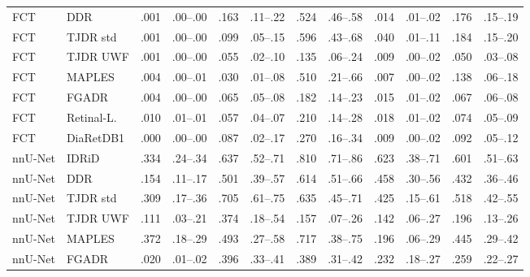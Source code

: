 \begin{landscape}
{\begin{longtable}{l l c c c c c c c c c c}
FCT & DDR & .001 & \scriptsize .00--.00 & .163 & \scriptsize .11--.22 & .524 & \scriptsize .46--.58 & .014 & \scriptsize .01--.02 & .176 & \scriptsize .15--.19 \\
FCT & TJDR std & .001 & \scriptsize .00--.00 & .099 & \scriptsize .05--.15 & .596 & \scriptsize .43--.68 & .040 & \scriptsize .01--.11 & .184 & \scriptsize .15--.20 \\
FCT & TJDR UWF & .001 & \scriptsize .00--.00 & .055 & \scriptsize .02--.10 & .135 & \scriptsize .06--.24 & .009 & \scriptsize .00--.02 & .050 & \scriptsize .03--.08 \\
FCT & MAPLES & .004 & \scriptsize .00--.01 & .030 & \scriptsize .01--.08 & .510 & \scriptsize .21--.66 & .007 & \scriptsize .00--.02 & .138 & \scriptsize .06--.18 \\
FCT & FGADR & .004 & \scriptsize .00--.00 & .065 & \scriptsize .05--.08 & .182 & \scriptsize .14--.23 & .015 & \scriptsize .01--.02 & .067 & \scriptsize .06--.08 \\
FCT & Retinal-L. & .010 & \scriptsize .01--.01 & .057 & \scriptsize .04--.07 & .210 & \scriptsize .14--.28 & .018 & \scriptsize .01--.02 & .074 & \scriptsize .05--.09 \\
FCT & DiaRetDB1 & .000 & \scriptsize .00--.00 & .087 & \scriptsize .02--.17 & .270 & \scriptsize .16--.34 & .009 & \scriptsize .00--.02 & .092 & \scriptsize .05--.12 \\
nnU-Net & IDRiD & .334 & \scriptsize .24--.34 & .637 & \scriptsize .52--.71 & .810 & \scriptsize .71--.86 & .623 & \scriptsize .38--.71 & .601 & \scriptsize .51--.63 \\
nnU-Net & DDR & .154 & \scriptsize .11--.17 & .501 & \scriptsize .39--.57 & .614 & \scriptsize .51--.66 & .458 & \scriptsize .30--.56 & .432 & \scriptsize .36--.46 \\
nnU-Net & TJDR std & .309 & \scriptsize .17--.36 & .705 & \scriptsize .61--.75 & .635 & \scriptsize .45--.71 & .425 & \scriptsize .15--.61 & .518 & \scriptsize .42--.55 \\
nnU-Net & TJDR UWF & .111 & \scriptsize .03--.21 & .374 & \scriptsize .18--.54 & .157 & \scriptsize .07--.26 & .142 & \scriptsize .06--.27 & .196 & \scriptsize .13--.26 \\
nnU-Net & MAPLES & .372 & \scriptsize .18--.29 & .493 & \scriptsize .27--.58 & .717 & \scriptsize .38--.75 & .196 & \scriptsize .06--.29 & .445 & \scriptsize .29--.42 \\
nnU-Net & FGADR & .020 & \scriptsize .01--.02 & .396 & \scriptsize .33--.41 & .389 & \scriptsize .31--.42 & .232 & \scriptsize .18--.27 & .259 & \scriptsize .22--.27 \\

\end{longtable}}
\end{landscape}
